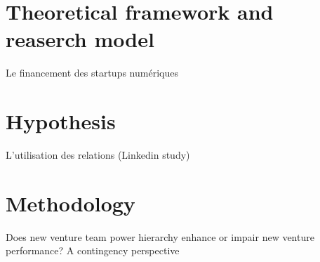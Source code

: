 \documentclass[11pt]{article}
\begin{document}
\section{Theoretical framework and reaserch model}

Le financement des startups numériques \citep{klein2020start}


\section{Hypothesis}

L'utilisation des relations (Linkedin study)

\section{Methodology}











Does new venture team power hierarchy enhance or impair new venture performance? A contingency perspective
\end{document}
